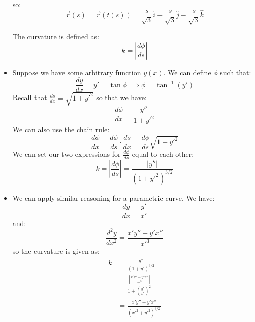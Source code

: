\begin{itemize}
\begin{example}
\begin{equation}
        \end{equation}
        so:
        \begin{equation}
            \vec{r}(s) = \vec{r}(t(s)) = \frac{s}{\sqrt{3}}\hat{i} + \frac{s}{\sqrt{3}}\hat{j} - \frac{s}{\sqrt{3}}\hat{k}
        \end{equation}
    \end{example}
    \begin{definition}
        The curvature is defined as:
        \begin{equation}
            k = \left| \frac{d\phi}{ds} \right|
        \end{equation}
    \end{definition}
    \item Suppose we have some arbitrary function $y(x)$. We can define $\phi$ such that:
    \begin{equation}
        \frac{dy}{dx} = y' = \tan \phi \implies \phi = \tan^{-1}(y')
    \end{equation}
    Recall that $\frac{ds}{dx} = \sqrt{1+y'^2}$ so that we have:
    \begin{equation}
        \frac{d\phi}{dx} = \frac{y''}{1+y'^2}
    \end{equation}
    We can also use the chain rule:
    \begin{equation}
        \frac{d\phi}{dx} = \frac{d\phi}{ds} \cdot \frac{ds}{dx} = \frac{d\phi}{ds}\sqrt{1+y'^2}
    \end{equation}
    We can set our two expressions for $\frac{d\phi}{ds}$ equal to each other:
    \begin{equation}
        k = \left|\frac{d\phi}{ds}\right| = \frac{|y''|}{(1+y'^2)^{3/2}}
    \end{equation}
    \item We can apply similar reasoning for a parametric curve. We have:
    \begin{equation}
        \frac{dy}{dx} = \frac{y'}{x'}
    \end{equation}
    and:
    \begin{equation}
        \frac{d^2y}{dx^2} = \frac{x'y''-y'x''}{x'^3}
    \end{equation}
    so the curvature is given as:
    \begin{align}
        k &= \frac{y''}{(1+y')^{3/2}} \\ 
        &= \frac{\left|\frac{x'y''-y'x''}{x'^3}\right|}{1+\left(\frac{y'}{x'}\right)^2} \\ 
        &= \frac{|x'y''-y'x''|}{(x'^2+y'^2)^{3/2}}

\end{align}
\end{itemize}
